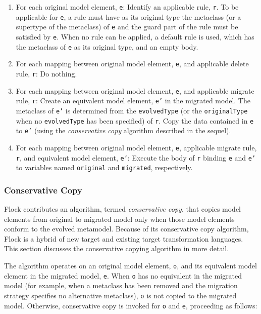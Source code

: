 \begin{enumerate}
	\item For each original model element, \texttt{e}:
	\subitem Identify an applicable rule, \texttt{r}. To be applicable for \texttt{e}, a rule must have as its original type the metaclass (or a supertype of the metaclass) of \texttt{e} and the guard part of the rule must be satisfied by \texttt{e}.
	\subitem When no rule can be applied, a default rule is used, which has the metaclass of \texttt{e} as its original type, and an empty body.
	
	\item For each mapping between original model element, \texttt{e}, and applicable delete rule, \texttt{r}:
	\subitem Do nothing.
	
	\item For each mapping between original model element, \texttt{e}, and applicable migrate rule, \texttt{r}:
	\subitem Create an equivalent model element, \texttt{e'} in the migrated model. The metaclass of \texttt{e'} is determined from the \texttt{evolvedType} (or the \texttt{originalType} when no \texttt{evolvedType} has been specified) of \texttt{r}.
	\subitem Copy the data contained in \texttt{e} to \texttt{e'} (using the \emph{conservative copy} algorithm described in the sequel).

	\item For each mapping between original model element, \texttt{e}, applicable migrate rule, \texttt{r}, and equivalent model element, \texttt{e'}:
	\subitem Execute the body of \texttt{r} binding \texttt{e} and \texttt{e'} to variables named \texttt{original} and \texttt{migrated}, respectively.
\end{enumerate}


\subsubsection{Conservative Copy}
\label{subsubsec:conservative_copying}
Flock contributes an algorithm, termed \emph{conservative copy}, that copies model elements from original to migrated model only when those model elements conform to the evolved metamodel. Because of its conservative copy algorithm, Flock is a hybrid of new target and existing target transformation languages. This section discusses the conservative copying algorithm in more detail.

The algorithm operates on an original model element, \texttt{o}, and its equivalent model element in the migrated model, \texttt{e}. When \texttt{o} has no equivalent in the migrated model (for example, when a metaclass has been removed and the migration strategy specifies no alternative metaclass), \texttt{o} is not copied to the migrated model. Otherwise, conservative copy is invoked for \texttt{o} and \texttt{e}, proceeding as follows:


